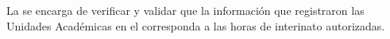 \begin{PDescripcion}
\begin{enumerate}
		\Ppaso[\PSubProceso] 
		La  se encarga de verificar y validar que la información que registraron las Unidades Académicas en el  corresponda a las horas de interinato autorizadas.

		
	\end{enumerate}		


\end{PDescripcion}